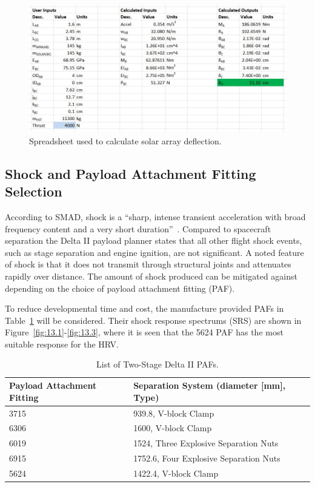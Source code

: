 \documentclass[paper=letter, fontsize=11pt]{scrartcl} %
\numberwithin{equation}{section} %
\numberwithin{figure}{section} %
\numberwithin{table}{section} %
\begin{document}
\begin{figure}[H]
    \begin{center}
    \includegraphics[width=.8\textwidth]{Pics/14.png}
    \caption{Spreadsheet used to calculate solar array deflection.}
    \label{fig:p14}
    \end{center}
\end{figure}

\subsection{Shock and Payload Attachment Fitting Selection}

According to SMAD, shock is a ``sharp, intense transient acceleration with broad frequency content and a very short duration''~\cite{ref12_8}. Compared to spacecraft separation the Delta II payload planner states that all other flight shock events, such as stage separation and engine ignition, are not significant. A noted feature of shock is that it does not transmit through structural joints and attenuates rapidly over distance. The amount of shock produced can be mitigated against depending on the choice of payload attachment fitting (PAF).

To reduce developmental time and cost, the manufacture provided PAFs in Table~\ref{13.1} will be considered. Their shock response spectrums (SRS) are shown in Figure~\ref{fig:13.1}-\ref{fig:13.3}, where it is seen that the 5624 PAF has the most suitable response for the HRV.

\begin{table}[H]
\centering
\begin{tabular}{l l}
\toprule
Payload Attachment Fitting & Separation System (diameter [mm], Type) \\
\midrule
3715 & 939.8, V-block Clamp \\
6306 & 1600, V-block Clamp \\
6019 & 1524, Three Explosive Separation Nuts \\
6915 & 1752.6, Four Explosive Separation Nuts \\
5624 & 1422.4, V-block Clamp \\
\bottomrule
\end{tabular}
\caption{List of Two-Stage Delta II PAFs.}
\label{13.1}
\end{table}
\end{document}
